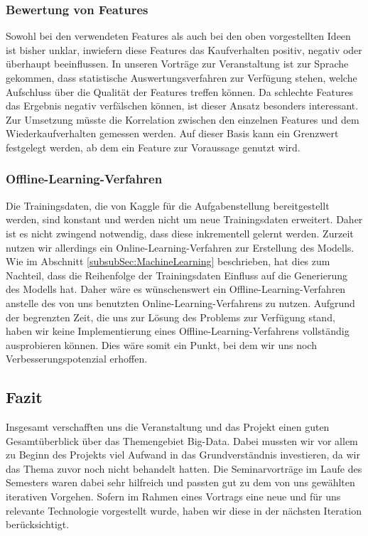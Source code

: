 \subsubsection{Bewertung von Features}	
Sowohl bei den verwendeten Features als auch bei den oben vorgestellten Ideen ist bisher unklar, inwiefern diese Features das Kaufverhalten positiv, negativ oder überhaupt beeinflussen.
In unseren Vorträge zur Veranstaltung ist zur Sprache gekommen, dass statistische Auswertungsverfahren zur Verfügung stehen, welche Aufschluss über die Qualität der Features treffen können. Da schlechte Features das Ergebnis negativ verfälschen können, ist dieser Ansatz besonders interessant.
Zur Umsetzung müsste die Korrelation zwischen den einzelnen Features und dem Wiederkaufverhalten gemessen werden. Auf dieser Basis kann ein Grenzwert festgelegt werden, ab dem ein Feature
zur Voraussage genutzt wird.

\subsubsection{Offline-Learning-Verfahren}	
Die Trainingsdaten, die von Kaggle für die Aufgabenstellung bereitgestellt werden, sind konstant und werden 
nicht um neue Trainingsdaten erweitert.
Daher ist es nicht zwingend notwendig, dass diese inkrementell gelernt werden.
Zurzeit nutzen wir allerdings ein Online-Learning-Verfahren zur Erstellung des Modells.
Wie im Abschnitt \ref{subsubSec:MachineLearning} beschrieben, hat dies zum Nachteil,
dass die Reihenfolge der Trainingsdaten Einfluss auf die Generierung des Modells hat. 
Daher wäre es wünschenswert ein Offline-Learning-Verfahren anstelle des von uns benutzten Online-Learning-Verfahrens zu nutzen.
Aufgrund der begrenzten Zeit, die uns zur Lösung des Problems zur Verfügung stand, haben wir keine Implementierung eines Offline-Learning-Verfahrens vollständig ausprobieren können.
Dies wäre somit ein Punkt, bei dem wir uns noch Verbesserungspotenzial erhoffen.

\subsection{Fazit}
Insgesamt verschafften uns die Veranstaltung und das Projekt einen guten Gesamtüberblick über das Themengebiet Big-Data.
Dabei mussten wir vor allem zu Beginn des Projekts viel Aufwand in das Grundverständnis investieren, da wir das Thema zuvor noch nicht behandelt hatten.
Die Seminarvorträge im Laufe des Semesters waren dabei sehr hilfreich und passten gut zu dem von uns gewählten iterativen Vorgehen.
Sofern im Rahmen eines Vortrags eine neue und für uns relevante Technologie vorgestellt wurde, haben wir diese in der nächsten Iteration berücksichtigt.  

